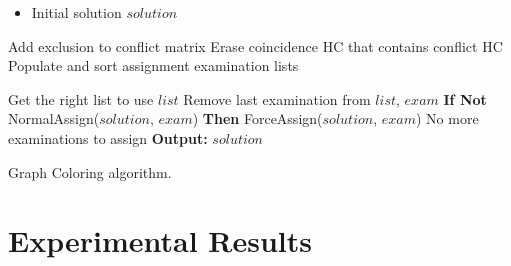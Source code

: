 
\begin{algorithm}
\begin{itemize}
\item Initial solution $solution$
\end{itemize}

\begin{algorithmic}[1]
\State Add exclusion to conflict matrix
\State Erase coincidence HC that contains conflict HC
\State Populate and sort assignment examination lists

\Repeat
	\State Get the right list to use $list$
	\State Remove last examination from $list$, $exam$
	\State \textbf{If Not} NormalAssign($solution$, $exam$) \textbf{Then} ForceAssign($solution$, $exam$)
\Until No more examinations to assign
\State  \textbf{Output:} $solution$
\end{algorithmic}
\caption{Graph Coloring algorithm.}
\label{alg:GraphColoring}
\end{algorithm}

\section{Experimental Results}

